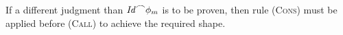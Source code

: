 \documentclass[10pt,a4paper]{amsart}
\theoremstyle{definition}
\newcommand{\chop}[0]{\raisebox{1ex}{$\frown$}}
\newcommand{\Skip}{\mbox{\bf skip}}
\newcommand{\judge}[2]{#1 : #2}
\begin{document}


If a different judgment than $\mathit{Id}\chop\phi_m$ is to be proven,
then rule (\textsc{Cons}) must be applied before (\textsc{Call}) to
achieve the required shape.

\def\defaultHypSeparation{\hskip 2em}
\end{document}
